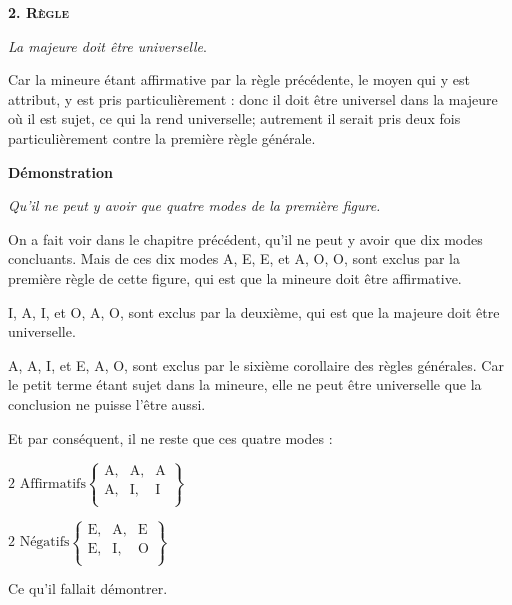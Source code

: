 \begin{center}{\bfseries\scshape\large 2. Règle}\end{center}

	\emph{La majeure doit être universelle}.

Car la mineure étant affirmative par la règle précédente, le moyen qui y est attribut, y est pris particulièrement : donc il doit être universel dans la majeure où il est sujet, ce qui la rend universelle; autrement il serait pris deux fois particulièrement contre la première règle générale.

\begin{center}{\bfseries Démonstration}\end{center}

\emph{Qu'il ne peut y avoir que quatre modes de la première figure.}

On a fait voir dans le chapitre précédent, qu'il ne peut y avoir que dix modes concluants. Mais de ces dix modes A, E, E, et A, O, O, sont exclus par la première règle de cette figure, qui est que la mineure doit être affirmative.

I, A, I, et O, A, O, sont exclus par la deuxième, qui est que la majeure doit être universelle.

A, A, I, et E, A, O, sont exclus par le sixième corollaire des règles générales. Car le petit terme étant sujet dans la mineure, elle ne peut être universelle que la conclusion ne puisse l'être aussi.

Et par conséquent, il ne reste que ces quatre modes :


\begin{center}
$ \text {2 Affirmatifs} \left \{
    \begin{array}{ccc}
	    \text {A,} & \text{A,} & \text{A} \\
  	    \text {A,} & \text{I,} & \text{I} \\
    \end{array}
	    \right \} $
\end{center}
\begin{center}
$ \text {2 Négatifs} \left \{
    \begin{array}{ccc}
	    \text {E,} & \text{A,} & \text{E} \\
	    \text {E,} & \text{I,} & \text{O} \\
    \end{array}
	    \right \} $
\end{center}


Ce qu'il fallait démontrer.

